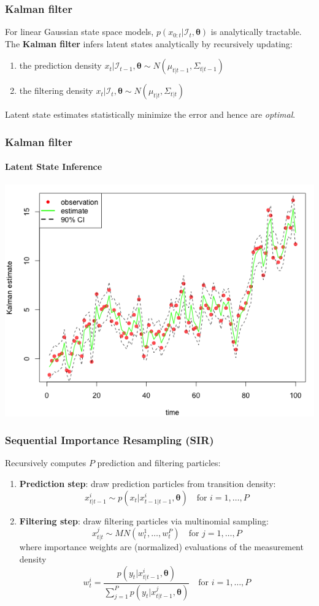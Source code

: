 \documentclass[11pt]{beamer}
\begin{document}
\begin{frame}
\frametitle{Kalman filter}
For linear Gaussian state space models, $p(x_{0:t} | \mathcal{I}_t,\boldsymbol{\theta})$ is analytically tractable. The \textbf{Kalman filter} infers latent states analytically by recursively updating:
\begin{enumerate}
\item the prediction density $x_{t} | \mathcal{I}_{t-1}, \boldsymbol{\theta} \sim N(\mu_{t | t-1}, \Sigma_{t | t-1})$
\item the filtering density $x_{t} | \mathcal{I}_{t}, \boldsymbol{\theta} \sim N(\mu_{t | t}, \Sigma_{t | t})$
\end{enumerate}
\bigskip
Latent state estimates statistically minimize the error and hence are \textit{optimal}.
\end{frame}

\begin{frame}
\frametitle{Kalman filter}
\framesubtitle{Latent State Inference}
\centering
\includegraphics[scale=0.45]{ullm-estimate-kalman}
\end{frame}

\begin{frame}
\frametitle{Sequential Importance Resampling (SIR)}
Recursively computes $P$ prediction and filtering particles:
\begin{enumerate}
	\item \textbf{Prediction step}: draw prediction particles from transition density:
	$$
	x_{t | t-1}^i \sim p(x_t | x_{t-1 | t-1}^i, \boldsymbol{\theta}) \quad \text{for } i=1, \ldots, P
	$$
	\item \textbf{Filtering step}: draw filtering particles via multinomial sampling: 	
	$$
	x_{t | t }^j \sim MN(w_t^1, \ldots, w_t^P) \quad \text{for } j=1, \ldots, P
	$$
	where importance weights are (normalized) evaluations of the measurement density 
	$$
	w_{t}^i = \frac{p(y_t | x_{t | t-1}^i, \boldsymbol{\theta})}{\sum_{j=1}^P p(y_t | x_{t | t-1}^j, \boldsymbol{\theta})} \quad \text{for } i=1, \ldots, P
	$$
\end{enumerate}
\end{frame}
\end{document}
